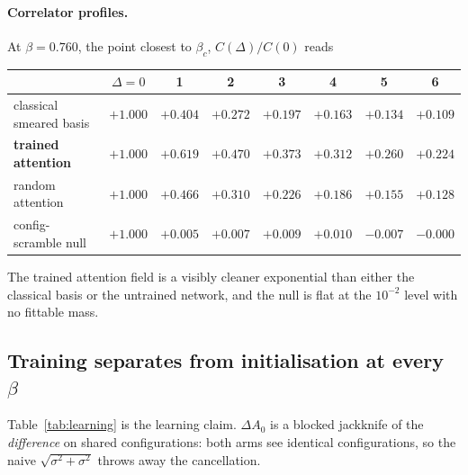 \documentclass[11pt,a4paper]{article}
\begin{document}
\paragraph{Correlator profiles.} At $\beta=0.760$, the point closest to
$\beta_c$, $C(\Delta)/C(0)$ reads
\begin{center}
\begin{tabular}{@{}lccccccc@{}}
\toprule
 & $\Delta=0$ & 1 & 2 & 3 & 4 & 5 & 6 \\
\midrule
classical smeared basis  & $+1.000$ & $+0.404$ & $+0.272$ & $+0.197$ & $+0.163$ & $+0.134$ & $+0.109$ \\
\textbf{trained attention} & $+1.000$ & $+0.619$ & $+0.470$ & $+0.373$ & $+0.312$ & $+0.260$ & $+0.224$ \\
random attention         & $+1.000$ & $+0.466$ & $+0.310$ & $+0.226$ & $+0.186$ & $+0.155$ & $+0.128$ \\
config-scramble null     & $+1.000$ & $+0.005$ & $+0.007$ & $+0.009$ & $+0.010$ & $-0.007$ & $-0.000$ \\
\bottomrule
\end{tabular}
\end{center}
The trained attention field is a visibly cleaner exponential than either the
classical basis or the untrained network, and the null is flat at the $10^{-2}$
level with no fittable mass.

\subsection{Training separates from initialisation at every $\beta$}
\label{sec:learning}

Table~\ref{tab:learning} is the learning claim. $\Delta A_0$ is a blocked
jackknife of the \emph{difference} on shared configurations: both arms see
identical configurations, so the naive $\sqrt{\sigma^2+\sigma^2}$ throws away
the cancellation.
\end{document}
